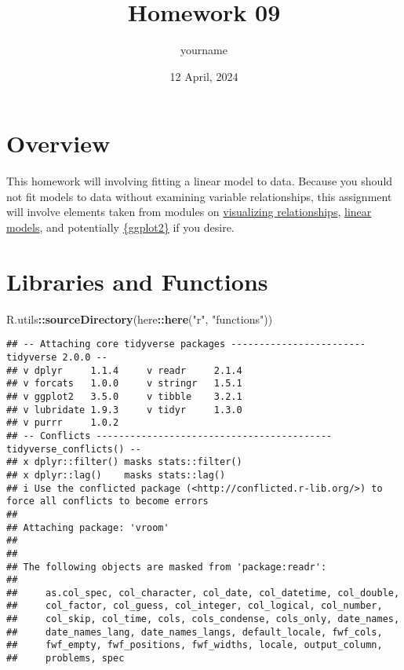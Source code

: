 \documentclass[
]{article}
\title{Homework 09}
\author{yourname}
\date{12 April, 2024}
\newenvironment{Shaded}{\begin{snugshade}}{\end{snugshade}}
\newcommand{\FunctionTok}[1]{\textcolor[rgb]{0.13,0.29,0.53}{\textbf{#1}}}
\newcommand{\NormalTok}[1]{#1}
\newcommand{\SpecialCharTok}[1]{\textcolor[rgb]{0.81,0.36,0.00}{\textbf{#1}}}
\newcommand{\StringTok}[1]{\textcolor[rgb]{0.31,0.60,0.02}{#1}}
\begin{document}
\maketitle

\hypertarget{overview}{%
\section{\texorpdfstring{\textbf{Overview}}{Overview}}\label{overview}}

This homework will involving fitting a linear model to data. Because you
should not fit models to data without examining variable relationships,
this assignment will involve elements taken from modules on
\href{https://gabrielcook.xyz/fods24/modules/18_linear_models.html}{visualizing
relationships},
\href{https://gabrielcook.xyz/fods24/modules/18_linear_models.html}{linear
models}, and potentially
\href{https://gabrielcook.xyz/fods24/modules/13_visualizing_data.html}{\{ggplot2\}}
if you desire.

\hypertarget{libraries-and-functions}{%
\section{\texorpdfstring{\textbf{Libraries and
Functions}}{Libraries and Functions}}\label{libraries-and-functions}}

\begin{Shaded}
\begin{Highlighting}[]
\NormalTok{R.utils}\SpecialCharTok{::}\FunctionTok{sourceDirectory}\NormalTok{(here}\SpecialCharTok{::}\FunctionTok{here}\NormalTok{(}\StringTok{"r"}\NormalTok{, }\StringTok{"functions"}\NormalTok{))}
\end{Highlighting}
\end{Shaded}

\begin{verbatim}
## -- Attaching core tidyverse packages ------------------------ tidyverse 2.0.0 --
## v dplyr     1.1.4     v readr     2.1.4
## v forcats   1.0.0     v stringr   1.5.1
## v ggplot2   3.5.0     v tibble    3.2.1
## v lubridate 1.9.3     v tidyr     1.3.0
## v purrr     1.0.2     
## -- Conflicts ------------------------------------------ tidyverse_conflicts() --
## x dplyr::filter() masks stats::filter()
## x dplyr::lag()    masks stats::lag()
## i Use the conflicted package (<http://conflicted.r-lib.org/>) to force all conflicts to become errors
## 
## Attaching package: 'vroom'
## 
## 
## The following objects are masked from 'package:readr':
## 
##     as.col_spec, col_character, col_date, col_datetime, col_double,
##     col_factor, col_guess, col_integer, col_logical, col_number,
##     col_skip, col_time, cols, cols_condense, cols_only, date_names,
##     date_names_lang, date_names_langs, default_locale, fwf_cols,
##     fwf_empty, fwf_positions, fwf_widths, locale, output_column,
##     problems, spec
\end{verbatim}
\end{document}
